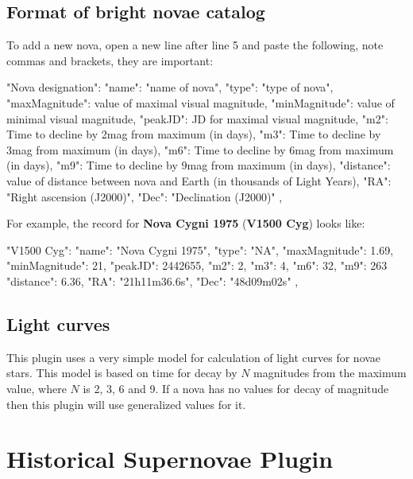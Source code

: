 \subsection{Format of bright novae catalog}
\label{sec:plugins:BrightNovae:format}

To add a new nova, open a new line after line 5 and paste the following, note commas and brackets, they are important:

\begin{configfile}\small
"Nova designation":
{
    "name": "name of nova",
    "type": "type of nova",
    "maxMagnitude": value of maximal visual magnitude,
    "minMagnitude": value of minimal visual magnitude,
    "peakJD": JD for maximal visual magnitude,
    "m2": Time to decline by 2mag from maximum (in days),
    "m3": Time to decline by 3mag from maximum (in days),
    "m6": Time to decline by 6mag from maximum (in days),
    "m9": Time to decline by 9mag from maximum (in days),
    "distance": value of distance between nova and 
                Earth (in thousands of Light Years),
    "RA": "Right ascension (J2000)",
    "Dec": "Declination (J2000)"
},
\end{configfile}

\noindent For example, the record for \textbf{Nova Cygni 1975} (\textbf{V1500 Cyg}) looks like:
\begin{configfile}\small
"V1500 Cyg":
{
    "name": "Nova Cygni 1975",
    "type": "NA",
    "maxMagnitude": 1.69,
    "minMagnitude": 21,
    "peakJD": 2442655,
    "m2": 2,
    "m3": 4,
    "m6": 32,
    "m9": 263
    "distance": 6.36,
    "RA": "21h11m36.6s",
    "Dec": "48d09m02s"
},
\end{configfile}

\subsection{Light curves}
\label{sec:plugins:BrightNovae:lightcurves}

This plugin uses a very simple model for calculation of light curves for
novae stars. This model is based on time for decay by $N$
magnitudes from the maximum value, where $N$ is 2, 3, 6 and 9. If a
nova has no values for decay of magnitude then this plugin will use
generalized values for it.

\newpage

\section{Historical Supernovae Plugin}
\label{sec:plugins:HistoricalSupernovae}


